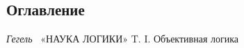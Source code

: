 \clearpage\setcounter{page}{1}\subsection{Оглавление}

\bigskip

{\centering
\textit{Гегель} \ «НАУКА ЛОГИКИ» T. I. Объективная логика
\par}

\setcounter{tocdepth}{7}
\renewcommand\contentsname{}
\tableofcontents

\bigskip


\bigskip

\clearpage\setcounter{page}{1}
\bigskip

